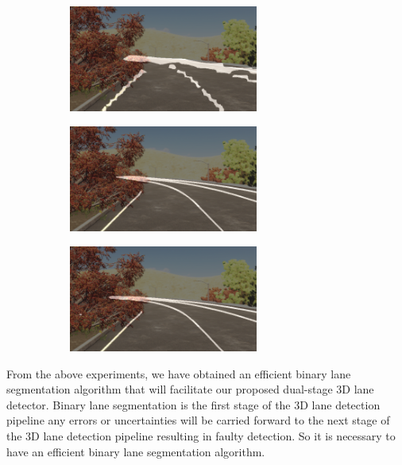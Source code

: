         \begin{figure}[h]
      \caption{Qualitative results for binary lane segmentation trained on sim3d dataset \cite{guo2020gen} for all the lanes present in the scene: (a) SCNN(Res18+Focal Loss) (b) RESA(Res18+Dice Loss) (c)RESA(Res18+Focal Loss)}
        \centering
        \begin{subfigure}{0.4\textwidth}
        \includegraphics[width=1\linewidth, height=3.5cm]{images/full_res18_scnn_focal.png} 
        \caption{}
        \label{fig:subim1}
        \end{subfigure}
        \begin{subfigure}{0.4\textwidth}
        \includegraphics[width=1\linewidth,height=3.5cm]{images/Resa_r18_full_dice.png}
        \caption{}
        \label{fig:subim2}
        \end{subfigure}
        \begin{subfigure}{0.4\textwidth}
        \includegraphics[width=1\linewidth, height=3.5cm]{images/Resa_r50_full_dice.png}
        \caption{}
        \label{fig:subim2}
        \end{subfigure}
        \label{fig:image2}
        \end{figure}
        
     From the above experiments, we have obtained an efficient binary lane segmentation algorithm that will facilitate our proposed dual-stage 3D lane detector. Binary lane segmentation is the first stage of the 3D lane detection pipeline any errors or uncertainties will be carried forward to the next stage of the 3D lane detection pipeline resulting in faulty detection. So it is necessary to have an efficient binary lane segmentation algorithm. 
    
